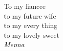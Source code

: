 \vfill
\begin{center}
	To my fiancee \\
	to my future wife \\
	to my every thing  \\
	to my lovely  sweet \\
	 \textit{Menna} 
\end{center}
\vfill